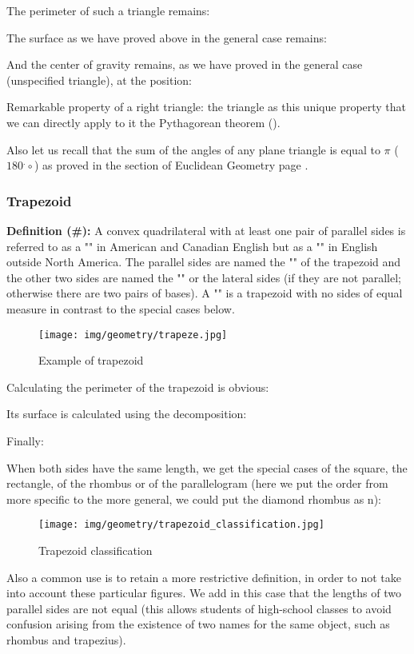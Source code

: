 {	The perimeter of such a triangle remains:
	
	The surface as we have proved above in the general case remains:
	
	
	And the center of gravity remains, as we have proved in the general case (unspecified triangle), at the position:
	
	Remarkable property of a right triangle: the triangle as this unique property that we can directly apply to it the Pythagorean theorem ().
	
	Also let us recall that the sum of the angles of any plane triangle is equal to $\pi$ ($180^.\circ$) as proved in the section of Euclidean Geometry page \pageref{angle sum theorem}.
	
	\subsubsection{Trapezoid}
	\textbf{Definition (\#\mydef):} A convex quadrilateral with at least one pair of parallel sides is referred to as a "" in American and Canadian English but as a "" in English outside North America. The parallel sides are named the "" of the trapezoid and the other two sides are named the "" or the lateral sides (if they are not parallel; otherwise there are two pairs of bases). A "" is a trapezoid with no sides of equal measure in contrast to the special cases below.
	\begin{figure}[H]
		\centering
		\texttt{[image: img/geometry/trapeze.jpg]}
		\caption{Example of trapezoid}
	\end{figure}
	Calculating the perimeter of the trapezoid is obvious:
	
	Its surface is calculated using the decomposition:
	
	Finally:
	
	When both sides have the same length, we get the special cases of the square, the rectangle, of the rhombus or of the parallelogram (here we put the order from more specific to the more general, we could put the diamond rhombus as n):
	\begin{figure}[H]
		\centering
		\texttt{[image: img/geometry/trapezoid\_classification.jpg]}
		\caption{Trapezoid classification}
	\end{figure}
	Also a common use is to retain a more restrictive definition, in order to not take into account these particular figures. We add in this case that the lengths of two parallel sides are not equal (this allows students of high-school classes to avoid confusion arising from the existence of two names for the same object, such as rhombus and trapezius).
	
}
